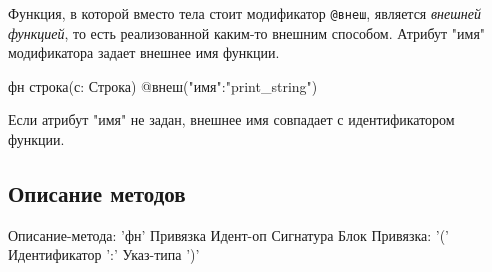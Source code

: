 Функция, в которой вместо тела стоит модификатор \verb|@внеш|, является \emph{внешней функцией}, то есть реализованной каким-то внешним способом.
Атрибут "имя" модификатора задает внешнее имя функции.

\begin{Trivil}
фн строка(с: Строка) @внеш("имя":"print_string")
\end{Trivil}

Если атрибут "имя" не задан, внешнее имя совпадает с идентификатором функции.

\hypertarget{methods}{%
\subsection{Описание методов}\label{decls:methods}}

\begin{Grammar}
Описание-метода: 'фн' Привязка Идент-оп Сигнатура Блок
Привязка: '(' Идентификатор ':' Указ-типа ')'
\end{Grammar} 